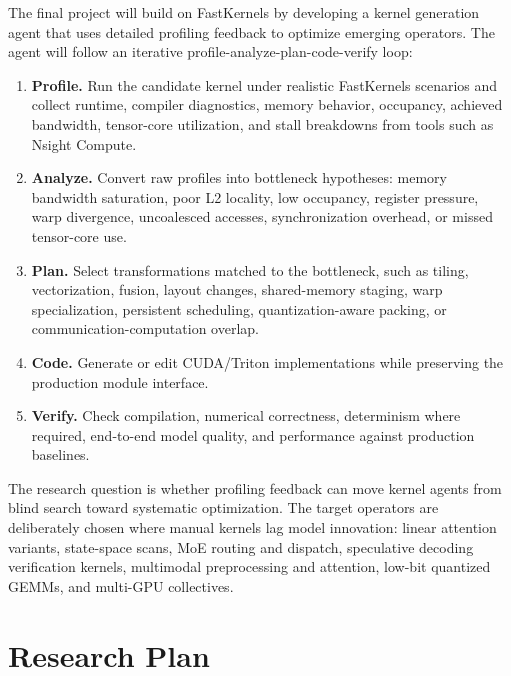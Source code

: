 \documentclass[11pt]{article}
\newcommand{\FastKernels}{FastKernels}
\begin{document}
The final project will build on \FastKernels{} by developing a kernel generation agent that uses detailed profiling feedback to optimize emerging operators. The agent will follow an iterative profile-analyze-plan-code-verify loop:

\begin{enumerate}[leftmargin=*, itemsep=2pt]
\item \textbf{Profile.} Run the candidate kernel under realistic \FastKernels{} scenarios and collect runtime, compiler diagnostics, memory behavior, occupancy, achieved bandwidth, tensor-core utilization, and stall breakdowns from tools such as Nsight Compute.
\item \textbf{Analyze.} Convert raw profiles into bottleneck hypotheses: memory bandwidth saturation, poor L2 locality, low occupancy, register pressure, warp divergence, uncoalesced accesses, synchronization overhead, or missed tensor-core use.
\item \textbf{Plan.} Select transformations matched to the bottleneck, such as tiling, vectorization, fusion, layout changes, shared-memory staging, warp specialization, persistent scheduling, quantization-aware packing, or communication-computation overlap.
\item \textbf{Code.} Generate or edit CUDA/Triton implementations while preserving the production module interface.
\item \textbf{Verify.} Check compilation, numerical correctness, determinism where required, end-to-end model quality, and performance against production baselines.
\end{enumerate}

The research question is whether profiling feedback can move kernel agents from blind search toward systematic optimization. The target operators are deliberately chosen where manual kernels lag model innovation: linear attention variants, state-space scans, MoE routing and dispatch, speculative decoding verification kernels, multimodal preprocessing and attention, low-bit quantized GEMMs, and multi-GPU collectives.

\section{Research Plan}
\end{document}
